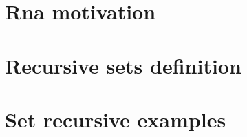 
\section*{Rna motivation}

\vfill
\section*{Recursive sets definition}

\vfill
\section*{Set recursive examples}

\vfill
